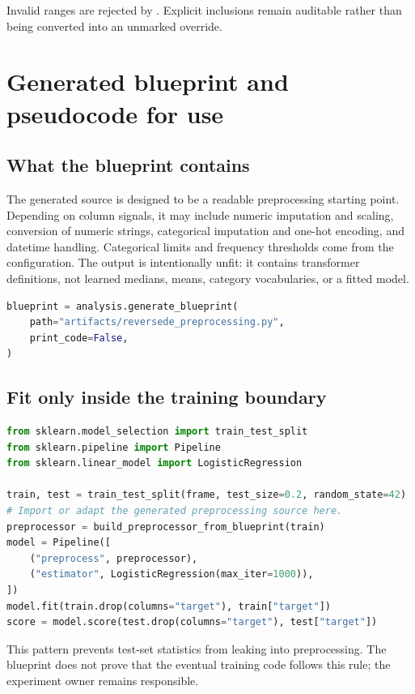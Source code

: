 \documentclass[10pt,a4paper,oneside]{article}
\newcommand{\code}[1]{\texttt{\small\detokenize{#1}}}
\begin{document}
Invalid ranges are rejected by \code{validate()}. Explicit inclusions remain auditable rather than
being converted into an unmarked override.

\section{Generated blueprint and pseudocode for use}

\subsection{What the blueprint contains}
The generated source is designed to be a readable preprocessing starting point. Depending on column
signals, it may include numeric imputation and scaling, conversion of numeric strings, categorical
imputation and one-hot encoding, and datetime handling. Categorical limits and frequency thresholds
come from the configuration. The output is intentionally unfit: it contains transformer definitions,
not learned medians, means, category vocabularies, or a fitted model.

\begin{lstlisting}[language=Python]
blueprint = analysis.generate_blueprint(
    path="artifacts/reversede_preprocessing.py",
    print_code=False,
)
\end{lstlisting}

\subsection{Fit only inside the training boundary}
\begin{lstlisting}[language=Python]
from sklearn.model_selection import train_test_split
from sklearn.pipeline import Pipeline
from sklearn.linear_model import LogisticRegression

train, test = train_test_split(frame, test_size=0.2, random_state=42)
# Import or adapt the generated preprocessing source here.
preprocessor = build_preprocessor_from_blueprint(train)
model = Pipeline([
    ("preprocess", preprocessor),
    ("estimator", LogisticRegression(max_iter=1000)),
])
model.fit(train.drop(columns="target"), train["target"])
score = model.score(test.drop(columns="target"), test["target"])
\end{lstlisting}

This pattern prevents test-set statistics from leaking into preprocessing. The blueprint does not
prove that the eventual training code follows this rule; the experiment owner remains responsible.
\end{document}
